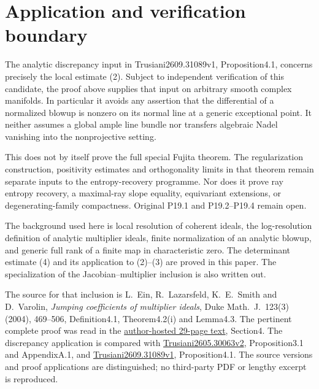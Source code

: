 \documentclass[11pt]{article}
\begin{document}
\section{Application and verification boundary}

The analytic discrepancy input in Trusiani2609.31089v1,
Proposition4.1, concerns precisely the local estimate (2).
Subject to independent verification of this candidate, the
proof above supplies that input on arbitrary smooth complex
manifolds. In particular it avoids any assertion that the
differential of a normalized blowup is nonzero on its normal
line at a generic exceptional point. It neither assumes a
global ample line bundle nor transfers algebraic Nadel
vanishing into the nonprojective setting.

This does not by itself prove the full special Fujita theorem.
The regularization construction, positivity estimates and
orthogonality limits in that theorem remain separate inputs
to the entropy-recovery programme. Nor does it prove ray
entropy recovery, a maximal-ray slope equality, equivariant
extensions, or degenerating-family compactness. Original P19.1
and P19.2--P19.4 remain open.

The background used here is local resolution of coherent
ideals, the log-resolution definition of analytic multiplier
ideals, finite normalization of an analytic blowup, and
generic full rank of a finite map in characteristic zero.
The determinant estimate (4) and its application to (2)--(3)
are proved in this paper. The specialization of the
Jacobian--multiplier inclusion is also written out.

The source for that inclusion is L.~Ein, R.~Lazarsfeld,
K.~E.~Smith and D.~Varolin, \emph{Jumping coefficients of
multiplier ideals}, Duke Math.~J.~123(3) (2004), 469--506,
Definition4.1, Theorem4.2(i) and Lemma4.3.
The pertinent complete proof was read in the
\href{https://www.math.stonybrook.edu/~dror/paper-jump.pdf}
{author-hosted 29-page text}, Section4.
The discrepancy application is compared with
\href{https://arxiv.org/pdf/2605.30063v2}{Trusiani2605.30063v2},
Proposition3.1 and AppendixA.1, and
\href{https://arxiv.org/pdf/2609.31089v1}{Trusiani2609.31089v1},
Proposition4.1.
The source versions and proof applications are distinguished;
no third-party PDF or lengthy excerpt is reproduced.
\end{document}
